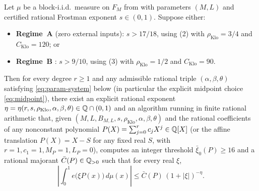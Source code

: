 \documentclass[11pt]{article}
\newcommand{\rhoK}{\rho_{\mathrm{Klo}}}
\newcommand{\CK}{C_{\mathrm{Klo}}}
\begin{document}
\begin{theorem}\label{thm:fourier-decay}
Let $\mu$ be a block-i.i.d.\ measure on $F_M$ from  with parameters $(M,L)$ and certified rational Frostman exponent $s\in(0,1)$. Suppose either:
\begin{itemize}[nosep]
\item \textup{\textbf{Regime~A}}  (zero external inputs): $s>17/18$, using \textup{(2)} with $\rhoK=3/4$ and $\CK=120$; or
\item \textup{\textbf{Regime~B}} : $s>9/10$, using \textup{(3)} with $\rhoK=1/2$ and $\CK=90$.
\end{itemize}
Then for every degree $r\ge1$ and any admissible rational triple $(\alpha,\beta,\theta)$ satisfying \eqref{eq:param-system} below (in particular the explicit midpoint choice \eqref{eq:midpoint}), there exist an explicit rational exponent $\eta=\eta(r,s,\rhoK,\alpha,\beta,\theta)\in\Q\cap(0,1)$ and an algorithm running in finite rational arithmetic that, given $(M,L,B_{M,L},s,\rhoK,\alpha,\beta,\theta)$ and the rational coefficients of any nonconstant polynomial $P(X)=\sum_{j=0}^r c_jX^j\in\mathbb Q[X]$ (or the affine translation $P(X)=X-S$ for any fixed real $S$, with $r=1,c_1=1,M_P=1,L_P=0$), computes an integer threshold $\bar\xi_0(P)\ge16$ and a rational majorant $\bar C(P)\in\mathbb Q_{>0}$ such that for every real $\xi$,
\begin{equation}\label{eq:fourier-decay}
\left|\int_0^1 e\bigl(\xi P(x)\bigr)\,d\mu(x)\right|\le \bar C(P)\,(1+|\xi|)^{-\eta}.
\end{equation}
\end{theorem}
\end{document}
